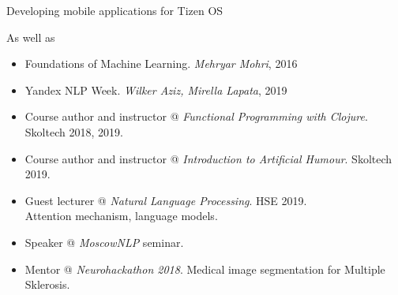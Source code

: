 \documentclass[10pt,a4paper,ragged2e,academicons]{altacv}
\begin{document}
Developing mobile applications for Tizen OS


{}
{}

As well as

\begin{itemize}
    \item Foundations of Machine Learning. \emph{Mehryar Mohri}, 2016
    \item Yandex NLP Week. \emph{Wilker Aziz, Mirella Lapata}, 2019
\end{itemize}

\begin{itemize}
    \item Course author and instructor @ \emph{Functional Programming with Clojure}. Skoltech 2018, 2019. 
    \item Course author and instructor @ \emph{Introduction to Artificial Humour}. Skoltech 2019.
    \item Guest lecturer @ \emph{Natural Language Processing}. HSE 2019. \\ Attention mechanism, language models.
    \item Speaker @ \emph{MoscowNLP} seminar.
    \item Mentor @ \emph{Neurohackathon 2018}. Medical image segmentation for Multiple Sklerosis.
\end{itemize}


\clearpage


\nocite{*}






\end{document}
